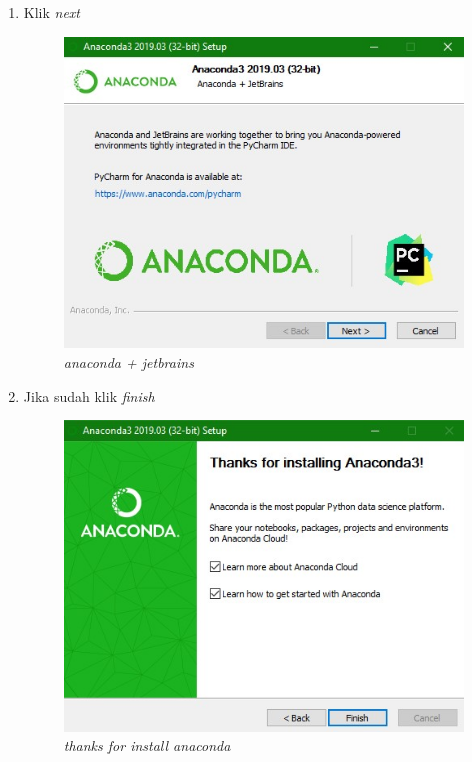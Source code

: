 \begin{enumerate}
\item Klik \textit{next}

\begin{figure}[H]
    \centering
    \includegraphics[scale=0.5]{figures/h}
    \caption{\textit{anaconda + jetbrains}}
    \label{Figureanaconda6}
\end{figure}

\item Jika sudah klik \textit{finish}
\begin{figure}[H]
    \centering
    \includegraphics[scale=0.5]{figures/qz}
    \caption{\textit{thanks for install anaconda}}
    \label{Figureanaconda7}
\end{figure}


\end{enumerate}

